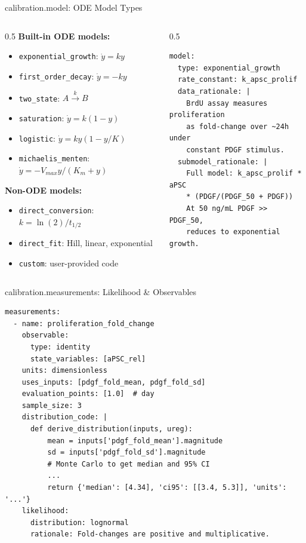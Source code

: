 \documentclass[aspectratio=169,10pt]{beamer}
\begin{document}
\begin{frame}[fragile]{calibration.model: ODE Model Types}
\begin{columns}
\begin{column}{0.5\textwidth}
\textbf{Built-in ODE models:}
\begin{itemize}
    \item \texttt{exponential\_growth}: $\dot{y} = ky$
    \item \texttt{first\_order\_decay}: $\dot{y} = -ky$
    \item \texttt{two\_state}: $A \xrightarrow{k} B$
    \item \texttt{saturation}: $\dot{y} = k(1-y)$
    \item \texttt{logistic}: $\dot{y} = ky(1-y/K)$
    \item \texttt{michaelis\_menten}: $\dot{y} = -V_{max}y/(K_m+y)$
\end{itemize}
\vspace{0.5em}
\textbf{Non-ODE models:}
\begin{itemize}
    \item \texttt{direct\_conversion}: $k = \ln(2)/t_{1/2}$
    \item \texttt{direct\_fit}: Hill, linear, exponential
    \item \texttt{custom}: user-provided code
\end{itemize}
\end{column}
\begin{column}{0.5\textwidth}
\begin{lstlisting}[style=yaml]
model:
  type: exponential_growth
  rate_constant: k_apsc_prolif
  data_rationale: |
    BrdU assay measures proliferation
    as fold-change over ~24h under
    constant PDGF stimulus.
  submodel_rationale: |
    Full model: k_apsc_prolif * aPSC
    * (PDGF/(PDGF_50 + PDGF))
    At 50 ng/mL PDGF >> PDGF_50,
    reduces to exponential growth.
\end{lstlisting}
\end{column}
\end{columns}
\end{frame}

\begin{frame}[fragile]{calibration.measurements: Likelihood \& Observables}
\begin{lstlisting}[style=yaml]
measurements:
  - name: proliferation_fold_change
    observable:
      type: identity
      state_variables: [aPSC_rel]
    units: dimensionless
    uses_inputs: [pdgf_fold_mean, pdgf_fold_sd]
    evaluation_points: [1.0]  # day
    sample_size: 3
    distribution_code: |
      def derive_distribution(inputs, ureg):
          mean = inputs['pdgf_fold_mean'].magnitude
          sd = inputs['pdgf_fold_sd'].magnitude
          # Monte Carlo to get median and 95% CI
          ...
          return {'median': [4.34], 'ci95': [[3.4, 5.3]], 'units': '...'}
    likelihood:
      distribution: lognormal
      rationale: Fold-changes are positive and multiplicative.
\end{lstlisting}
\end{frame}
\end{document}
